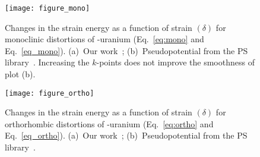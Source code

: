 \begin{appendices}
\begin{figure}
	\centering
	\texttt{[image: figure\_mono]}
    \caption[Changes in the strain energy as a function of strain $(\delta)$ for monoclinic distortions of \textgamma-uranium ]{Changes in the strain energy as a function of strain $(\delta)$ for monoclinic distortions of \textgamma-uranium (Eq.~\eqref{eq:mono} and Eq.~\eqref{eq_mono}). (a)~Our work~\cite{iasir2020pseudopotential}; (b)~Pseudopotential from the PS library~\cite{dal2014pseudopotentials, pp1}. Increasing the $k$-points does not improve the smoothness of plot (b).}
\label{fig:monogamma}
\end{figure}

\begin{figure}
	\centering
	\texttt{[image: figure\_ortho]}
    \caption[Changes in the strain energy as a function of strain $(\delta)$ for orthorhombic distortions of \textgamma-uranium ]{Changes in the strain energy as a function of strain $(\delta)$ for orthorhombic distortions of \textgamma-uranium (Eq.~\eqref{eq:ortho} and Eq.~\eqref{eq_ortho}). (a)~Our work~\cite{iasir2020pseudopotential}; (b)~Pseudopotential from the PS library~\cite{dal2014pseudopotentials, pp1}.}
	\label{fig:orthogamma}
\end{figure}

\end{appendices}


%


